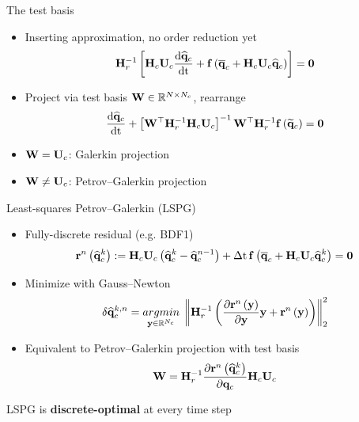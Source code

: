 \documentclass[]{beamer}
\begin{document}
\begin{frame}{The test basis}
    \begin{itemize}
        \item Inserting approximation, no order reduction yet
        \begin{equation*}
            \resScaleInv \left[\consScale \consTrial \ode{\consVecCoef}{\timeVar} + \rhsFunc{\consVecCent + \consScale \consTrial \consVecCoef}\right] = \zeroVec 
        \end{equation*}
        \item Project via test basis $\testBasis \in \mathbb{R}^{\numDOF \times \numConsModes}$, rearrange
        \begin{equation*}
            \ode{\consVecCoef}{\timeVar} + \left[ \testBasis^\top \resScaleInv \consScale \consTrial \right]^{-1} \testBasis^\top \resScaleInv \rhsFunc{\consVecRom} = \zeroVec
        \end{equation*}
        \item $\testBasis = \consTrial$: Galerkin projection
        \item $\testBasis \neq \consTrial$: Petrov--Galerkin projection 
    \end{itemize}
\end{frame}

\begin{frame}{Least-squares Petrov--Galerkin (LSPG)\footnotemark[3]}
    \begin{itemize}
		\item Fully-discrete residual (e.g. BDF1)
		\begin{equation*}
			\resFuncIter{\timeIdx}{\consVecCoef^{\newtonIdx}} \defEq \consScale \consTrial \left( \consVecCoef^{\newtonIdx} - \consVecCoef^{\timeIdx-1} \right) + \dt \, \rhsFunc{\consVecCent + \consScale \consTrial \consVecCoef^{\newtonIdx}} = \zeroVec
		\end{equation*}
		\item Minimize with Gauss--Newton
		\begin{equation*}
			\delta \consVecCoef^{\newtonIdx, \timeIdx} = \argmin{\dummyVec \in \mathbb{R}^{\numConsModes}} \norm{\resScaleInv \left(\pde{\resFuncIter{\timeIdx}{\dummyVec}}{\dummyVec} \dummyVec + \resFuncIter{\timeIdx}{\dummyVec}\right)}_2^2
		\end{equation*}
		\item Equivalent to Petrov--Galerkin projection with test basis
		\begin{equation*}
			\testBasis = \resScaleInv \pde{\resFuncIter{\timeIdx}{\consVecCoef^{\newtonIdx}}}{\consVec} \consScale \consTrial
		\end{equation*}
	\end{itemize}
	\vspace{-1em}
	\begin{tcolorbox}[colframe=blue!50!white,halign=center]
		LSPG is \textbf{discrete-optimal} at every time step
	\end{tcolorbox}
\end{frame}
\end{document}
